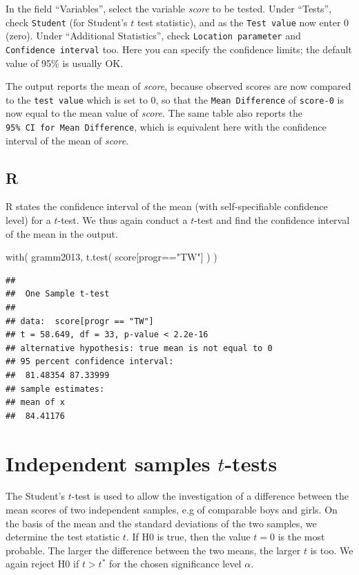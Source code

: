 \documentclass[
]{book}
\newenvironment{Shaded}{\begin{snugshade}}{\end{snugshade}}
\newcommand{\FunctionTok}[1]{\textcolor[rgb]{0.00,0.00,0.00}{#1}}
\newcommand{\NormalTok}[1]{#1}
\newcommand{\SpecialCharTok}[1]{\textcolor[rgb]{0.00,0.00,0.00}{#1}}
\newcommand{\StringTok}[1]{\textcolor[rgb]{0.31,0.60,0.02}{#1}}
\begin{document}
In the field ``Variables'', select the variable \emph{score} to be tested.
Under ``Tests'', check \texttt{Student} (for Student's \(t\) test statistic), and as the \texttt{Test\ value} now enter \(0\) (zero).
Under ``Additional Statistics'', check \texttt{Location\ parameter} and \texttt{Confidence\ interval} too. Here you can specify the confidence limits; the default value of 95\% is usually OK.

The output reports the mean of \emph{score}, because observed scores are now compared to the \texttt{test\ value} which is set to \(0\), so that the \texttt{Mean\ Difference} of \texttt{score-0} is now equal to the mean value of \emph{score}. The same table also reports the \texttt{95\%\ CI\ for\ Mean\ Difference}, which is equivalent here with the confidence interval of the mean of \emph{score}.

\hypertarget{r-13}{%
\subsection{R}\label{r-13}}

R states the confidence interval of the mean (with self-specifiable
confidence level) for a \(t\)-test. We thus again conduct a \(t\)-test
and find the confidence interval of the mean in the
output.

\begin{Shaded}
\begin{Highlighting}[]
\FunctionTok{with}\NormalTok{( gramm2013, }\FunctionTok{t.test}\NormalTok{( score[progr}\SpecialCharTok{==}\StringTok{"TW"}\NormalTok{] ) )}
\end{Highlighting}
\end{Shaded}

\begin{verbatim}
## 
##  One Sample t-test
## 
## data:  score[progr == "TW"]
## t = 58.649, df = 33, p-value < 2.2e-16
## alternative hypothesis: true mean is not equal to 0
## 95 percent confidence interval:
##  81.48354 87.33999
## sample estimates:
## mean of x 
##  84.41176
\end{verbatim}

\hypertarget{sec:ttest-indep}{%
\section{\texorpdfstring{Independent samples \(t\)-tests}{Independent samples t-tests}}\label{sec:ttest-indep}}

The Student's \(t\)-test is used to allow the investigation of a difference
between the mean scores of two independent samples, e.g of
comparable boys and girls. On the basis of the mean and the standard
deviations of the two samples, we determine the test statistic \(t\).
If H0 is true, then the value \(t=0\) is the most probable. The larger the difference
between the two means, the larger \(t\) is too. We again reject H0 if \(t>t^*\)
for the chosen significance level \(\alpha\).
\end{document}
